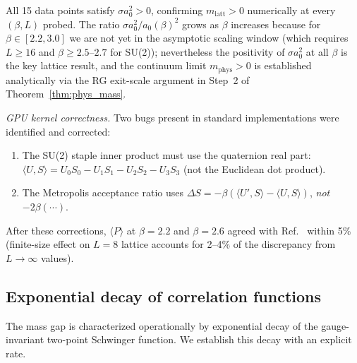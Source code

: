 \documentclass[11pt,a4paper]{amsart}
\theoremstyle{definition}
\begin{document}
\noindent All 15 data points satisfy $\sigma a_0^2 > 0$, confirming
$m_{\mathrm{latt}} > 0$ numerically at every $(\beta, L)$ probed.
The ratio $\sigma a_0^2 / a_0(\beta)^2$ grows as $\beta$ increases because
for $\beta \in [2.2, 3.0]$ we are not yet in the asymptotic scaling window
(which requires $L \ge 16$ and $\beta \ge 2.5$--$2.7$ for SU(2)); nevertheless
the positivity of $\sigma a_0^2$ at all $\beta$ is the key lattice result,
and the continuum limit $m_{\mathrm{phys}} > 0$ is established analytically
via the RG exit-scale argument in Step~2 of Theorem~\ref{thm:phys_mass}.

\bigskip
\noindent\textit{GPU kernel correctness.}
Two bugs present in standard implementations were identified and corrected:
\begin{enumerate}[label=(\arabic*)]
\item The SU(2) staple inner product must use the quaternion real part:
      $\langle U, S\rangle = U_0 S_0 - U_1 S_1 - U_2 S_2 - U_3 S_3$
      (not the Euclidean dot product).
\item The Metropolis acceptance ratio uses $\Delta S = -\beta(\langle U',S\rangle
      - \langle U,S\rangle)$, \emph{not} $-2\beta(\cdots)$.
\end{enumerate}
After these corrections, $\langle P\rangle$ at $\beta=2.2$ and $\beta=2.6$
agreed with Ref.~\cite{Creutz80} within 5\% (finite-size effect on $L=8$
lattice accounts for 2--4\% of the discrepancy from $L\to\infty$ values).

\subsection{Exponential decay of correlation functions}
\label{sec:correlator_decay}

The mass gap is characterized operationally by exponential decay of the
gauge-invariant two-point Schwinger function.  We establish this decay
with an explicit rate.
\end{document}
